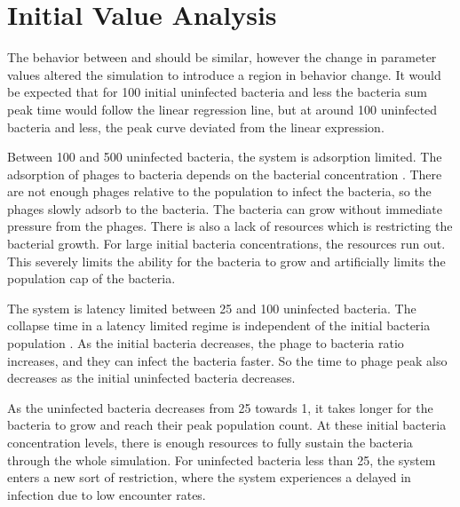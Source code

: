 \section{Initial Value Analysis}
The behavior between  and  should be similar, however the change in parameter values altered the simulation to introduce a region in behavior change. 
It would be expected that for 100 initial uninfected bacteria and less the bacteria sum peak time would follow the linear regression line, but at around 100 uninfected bacteria and less, the peak curve deviated from the linear expression. 

Between 100 and 500 uninfected bacteria, the system is adsorption limited. 
The adsorption of phages to bacteria depends on the bacterial concentration \cite{mullaExtremeDiversityPhage2024}. 
There are not enough phages relative to the population to infect the bacteria, so the phages slowly adsorb to the bacteria. 
The bacteria can grow without immediate pressure from the phages. 
There is also a lack of resources which is restricting the bacterial growth. 
For large initial bacteria concentrations, the resources run out. 
This severely limits the ability for the bacteria to grow and artificially limits the population cap of the bacteria. 

The system is latency limited between 25 and 100 uninfected bacteria. 
The collapse time in a latency limited regime is independent of the initial bacteria population \cite{mullaExtremeDiversityPhage2024}. 
As the initial bacteria decreases, the phage to bacteria ratio increases, and they can infect the bacteria faster. 
So the time to phage peak also decreases as the initial uninfected bacteria decreases. 

As the uninfected bacteria decreases from 25 towards 1, it takes longer for the bacteria to grow and reach their peak population count. 
At these initial bacteria concentration levels, there is enough resources to fully sustain the bacteria through the whole simulation. 
For uninfected bacteria less than 25, the system enters a new sort of restriction, where the system experiences a delayed in infection due to low encounter rates. 

